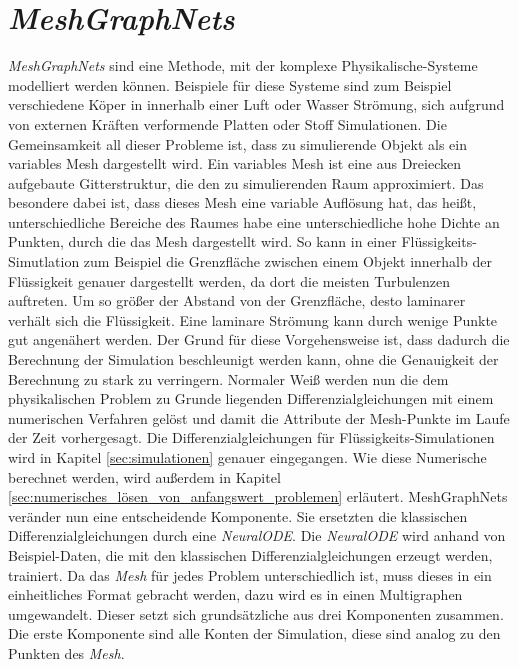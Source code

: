 

\section{\textit{MeshGraphNets}} \label{sec:meshgraphnets}

\textit{MeshGraphNets} \cite{meshgraphnets} sind eine Methode, mit der komplexe Physikalische-Systeme modelliert werden können.
Beispiele für diese Systeme sind zum Beispiel verschiedene Köper in innerhalb einer Luft oder Wasser Strömung, 
sich aufgrund von externen Kräften verformende Platten oder Stoff Simulationen.
Die Gemeinsamkeit all dieser Probleme ist, dass zu simulierende Objekt als ein variables Mesh dargestellt wird.
Ein variables Mesh ist eine aus Dreiecken aufgebaute Gitterstruktur, die den zu simulierenden Raum approximiert.
Das besondere dabei ist, dass dieses Mesh eine variable Auflösung hat, das heißt, unterschiedliche Bereiche des Raumes 
habe eine unterschiedliche hohe Dichte an Punkten, durch die das Mesh dargestellt wird.
So kann in einer Flüssigkeits-Simutlation zum Beispiel die Grenzfläche zwischen einem Objekt innerhalb der Flüssigkeit
genauer dargestellt werden, da dort die meisten Turbulenzen auftreten.
Um so größer der Abstand von der Grenzfläche, desto laminarer verhält sich die Flüssigkeit.
Eine laminare Strömung kann durch wenige Punkte gut angenähert werden.
Der Grund für diese Vorgehensweise ist, dass dadurch die Berechnung der Simulation beschleunigt werden kann,
ohne die Genauigkeit der Berechnung zu stark zu verringern.
Normaler Weiß werden nun die dem physikalischen Problem zu Grunde liegenden Differenzialgleichungen mit einem numerischen Verfahren gelöst 
und damit die Attribute der Mesh-Punkte im Laufe der Zeit vorhergesagt.
Die Differenzialgleichungen für Flüssigkeits-Simulationen wird in Kapitel \ref{sec:simulationen} genauer eingegangen.
Wie diese Numerische berechnet werden, wird außerdem in Kapitel \ref{sec:numerisches_lösen_von_anfangswert_problemen} erläutert.
MeshGraphNets veränder nun eine entscheidende Komponente.
Sie ersetzten die klassischen Differenzialgleichungen durch eine \textit{NeuralODE}.
Die \textit{NeuralODE} wird anhand von Beispiel-Daten, die mit den klassischen Differenzialgleichungen erzeugt werden, trainiert.
Da das \textit{Mesh} für jedes Problem unterschiedlich ist, muss dieses in ein einheitliches Format gebracht werden, dazu wird es in einen
Multigraphen umgewandelt.
Dieser setzt sich grundsätzliche aus drei Komponenten zusammen.
Die erste Komponente sind alle Konten der Simulation, diese sind analog zu den Punkten des \textit{Mesh}.
